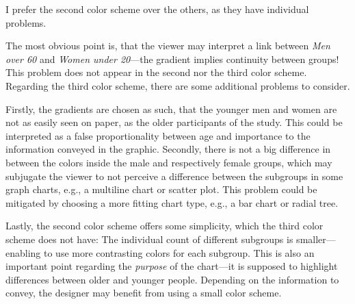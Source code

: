 

\renewcommand{\ex}{4}
\setcounter{section}{\ex}
\newcommand{\Prop}{\text{Pr}}


    \maketitle

    \begin{exercise}[Colors]
        I prefer the second color scheme over the others, as they have individual problems.

        The most obvious point is, that the viewer may interpret a link between \emph{Men over 60} and \emph{Women under 20}---the gradient implies continuity between groups!
        This problem does not appear in the second nor the third color scheme.
        Regarding the third color scheme, there are some additional problems to consider.
        
        Firstly, the gradients are chosen as such, that the younger men and women are not as easily seen on paper, as the older participants of the study.
        This could be interpreted as a false proportionality between age and importance to the information conveyed in the graphic.
        Secondly, there is not a big difference in between the colors inside the male and respectively female groups, which may subjugate the viewer to not perceive a difference between the subgroups in some graph charts, e.g., a multiline chart or scatter plot.
        This problem could be mitigated by choosing a more fitting chart type, e.g., a bar chart or radial tree.

        Lastly, the second color scheme offers some simplicity, which the third color scheme does not have: The individual count of different subgroups is smaller---enabling to use more contrasting colors for each subgroup.
        This is also an important point regarding the \emph{purpose} of the chart---it is supposed to highlight differences between older and younger people.
        Depending on the information to convey, the designer may benefit from using a small color scheme.
    \end{exercise}

